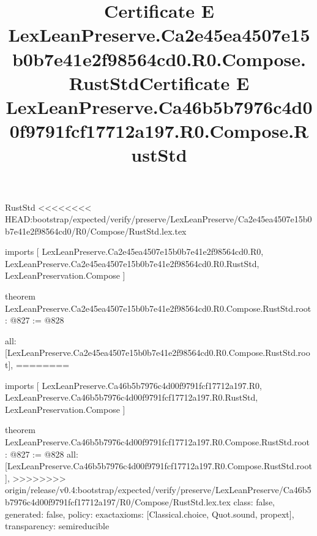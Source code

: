 \begin{lexlean}{RustStd}
<<<<<<<< HEAD:bootstrap/expected/verify/preserve/LexLeanPreserve/Ca2e45ea4507e15b0b7e41e2f98564cd0/R0/Compose/RustStd.lex.tex
\title{Certificate E LexLeanPreserve.Ca2e45ea4507e15b0b7e41e2f98564cd0.R0.Compose.RustStd}
\begin{coremodule}
imports [
  LexLeanPreserve.Ca2e45ea4507e15b0b7e41e2f98564cd0.R0,
  LexLeanPreserve.Ca2e45ea4507e15b0b7e41e2f98564cd0.R0.RustStd,
  LexLeanPreservation.Compose
]

theorem LexLeanPreserve.Ca2e45ea4507e15b0b7e41e2f98564cd0.R0.Compose.RustStd.root : @827 := @828 {
  all: [LexLeanPreserve.Ca2e45ea4507e15b0b7e41e2f98564cd0.R0.Compose.RustStd.root],
========
\title{Certificate E LexLeanPreserve.Ca46b5b7976c4d00f9791fcf17712a197.R0.Compose.RustStd}
\begin{coremodule}
imports [
  LexLeanPreserve.Ca46b5b7976c4d00f9791fcf17712a197.R0,
  LexLeanPreserve.Ca46b5b7976c4d00f9791fcf17712a197.R0.RustStd,
  LexLeanPreservation.Compose
]

theorem LexLeanPreserve.Ca46b5b7976c4d00f9791fcf17712a197.R0.Compose.RustStd.root : @827 := @828 {
  all: [LexLeanPreserve.Ca46b5b7976c4d00f9791fcf17712a197.R0.Compose.RustStd.root],
>>>>>>>> origin/release/v0.4:bootstrap/expected/verify/preserve/LexLeanPreserve/Ca46b5b7976c4d00f9791fcf17712a197/R0/Compose/RustStd.lex.tex
  class: false,
  generated: false,
  policy: exact{axioms: [Classical.choice, Quot.sound, propext]},
  transparency: semireducible
}


\end{coremodule}}
\end{coremodule}
\end{lexlean}

